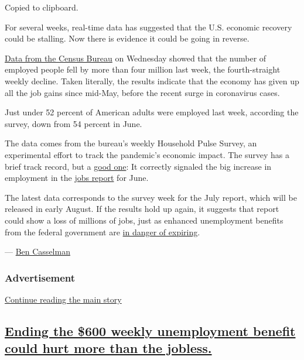 Copied to clipboard.

For several weeks, real-time data has suggested that the U.S. economic
recovery could be stalling. Now there is evidence it could be going in
reverse.

\href{https://www.census.gov/data/tables/2020/demo/hhp/hhp11.html}{Data
from the Census Bureau} on Wednesday showed that the number of employed
people fell by more than four million last week, the fourth-straight
weekly decline. Taken literally, the results indicate that the economy
has given up all the job gains since mid-May, before the recent surge in
coronavirus cases.

Just under 52 percent of American adults were employed last week,
according the survey, down from 54 percent in June.

The data comes from the bureau's weekly Household Pulse Survey, an
experimental effort to track the pandemic's economic impact. The survey
has a brief track record, but a
\href{https://twitter.com/ernietedeschi/status/1285940771892482050}{good
one}: It correctly signaled the big increase in employment in the
\href{https://www.nytimes.com/2020/07/02/business/economy/jobs-unemployment-coronavirus.html}{jobs
report} for June.

The latest data corresponds to the survey week for the July report,
which will be released in early August. If the results hold up again, it
suggests that report could show a loss of millions of jobs, just as
enhanced unemployment benefits from the federal government are
\href{https://www.nytimes.com/2020/07/02/business/economy/jobs-unemployment-coronavirus.html}{in
danger of expiring}.

--- \href{https://www.nytimes.com/by/ben-casselman}{Ben Casselman}

\hypertarget{advertisement-2}{%
\subsubsection{Advertisement}\label{advertisement-2}}

\protect\hyperlink{after-dfp-ad-mid3}{Continue reading the main story}

\hypertarget{ending-the-600-weekly-unemployment-benefit-could-hurt-more-than-the-jobless}{%
\subsection{\texorpdfstring{\protect\hyperlink{ending-the-600-weekly-unemployment-benefit-could-hurt-more-than-the-jobless}{Ending
the \$600 weekly unemployment benefit could hurt more than the
jobless.}}{Ending the \$600 weekly unemployment benefit could hurt more than the jobless.}}\label{ending-the-600-weekly-unemployment-benefit-could-hurt-more-than-the-jobless}}

